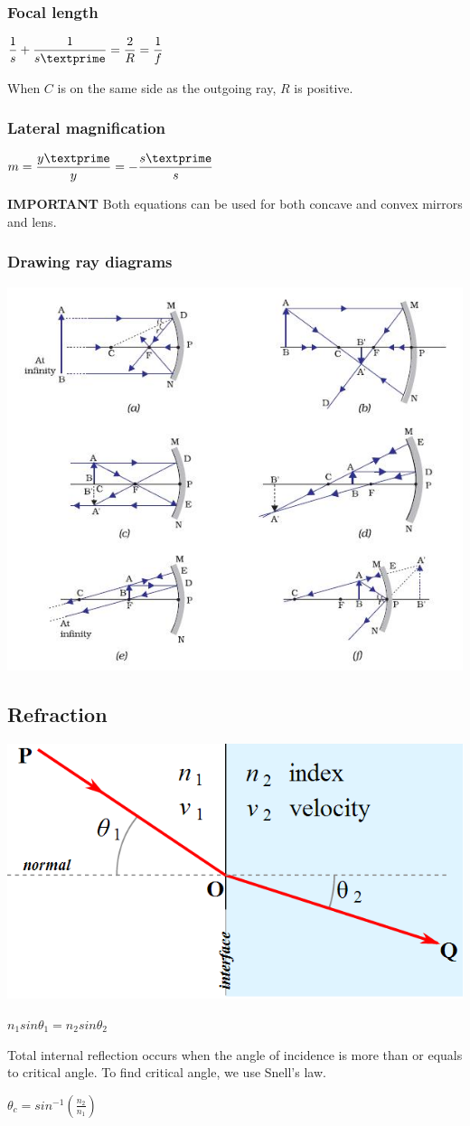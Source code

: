 \documentclass[a4paper]{article}
\begin{document}
\subsubsection{Focal length}
\begin{center}
$\displaystyle \frac{1}{s} + \frac{1}{s\textprime} = \frac{2}{R} = \frac{1}{f}$
\end{center}
When $C$ is on the same side as the outgoing ray, $R$ is positive.
\subsubsection{Lateral magnification}
\begin{center}
$m = \displaystyle\frac{y\textprime}{y} = -\frac{s\textprime}{s}$
\end{center}
\textbf{IMPORTANT} Both equations can be used for both concave and convex mirrors and lens. 
\subsubsection{Drawing ray diagrams}
\begin{center}
\includegraphics[width=9 cm]{drawing_rays.jpg}
\end{center}
\subsection{Refraction}
\begin{center}
\includegraphics[width=7 cm]{refraction.png}
\end{center}
\begin{center}
$n_1sin\theta_1 = n_2sin\theta_2$
\end{center}
Total internal reflection occurs when the angle of incidence is more than or equals to critical angle. To find critical angle, we use Snell's law.
\begin{center}
$\displaystyle\theta_c = sin^{-1}\left(\frac{n_2}{n_1}\right)$
\end{center}
\end{document}
